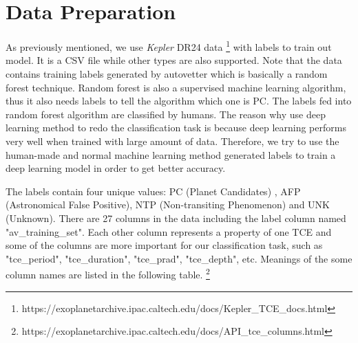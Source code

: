 \chapter{Data Preparation}
  As previously mentioned, we use \textit{Kepler} DR24 data 
  \footnote{ https://exoplanetarchive.ipac.caltech.edu/docs/Kepler\_TCE\_docs.html}
  with labels to train out model. It is a CSV file while other types are also 
  supported. Note that the data contains training labels generated by autovetter which 
  is basically a
  random forest technique. Random forest is also a supervised machine learning algorithm,
  thus it also needs labels to tell the algorithm which one is PC. The labels fed into 
  random forest algorithm are classified by humans. The reason why use deep learning method 
  to redo the classification task is because deep learning performs very well when trained 
  with large amount of data. Therefore, we try to use the human-made and normal machine 
  learning method generated labels to train a deep learning model in order to get better 
  accuracy.

  The labels contain four unique values: 
  PC (Planet Candidates) , AFP (Astronomical False Positive), NTP 
  (Non-transiting Phenomenon) and UNK (Unknown). There are 27 columns in the data including 
  the label column named "av\_training\_set". Each other column represents a property of one 
  TCE and some of the columns are more important for our classification task, such as 
  "tce\_period", "tce\_duration", "tce\_prad", "tce\_depth", etc. Meanings of the some 
  column names are listed in the following table.
  \footnote{https://exoplanetarchive.ipac.caltech.edu/docs/API\_tce\_columns.html}

  \begin{table}[!htp]
    \centering
    \centering
    \caption[Descriptions of column names.]{Descriptions of column names. The listed 
      properties are more important for identifying PC.}
    \label{table: difinitions_of_column_names}
  \end{table}
  
